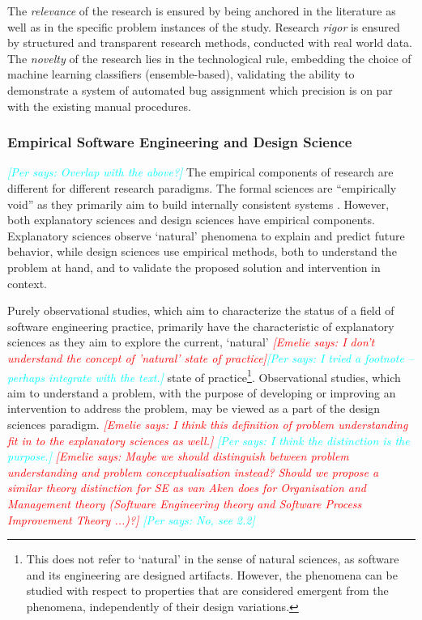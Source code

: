 \documentclass[graybox]{svmult}
\newcommand{\emelie}[1]{\textcolor{red}{{\it [Emelie says: #1]}}}
\newcommand{\per}[1]{\textcolor{cyan}{{\it [Per says: #1]}}}
\newcommand{\emelie}[1]{}
\newcommand{\per}[1]{}
\begin{document}
The \emph{relevance} of the research is ensured by being anchored in the literature as well as in the specific problem instances of the study. Research \emph{rigor} is ensured by structured and transparent research methods, conducted with real world data. The \emph{novelty} of the research lies in the technological rule, embedding the choice of machine learning classifiers (ensemble-based), validating the ability to demonstrate a system of automated bug assignment which precision is on par with the existing manual procedures.


 

\subsubsection{Empirical Software Engineering and Design Science} \per{Overlap with the above?}
The empirical components of research are different for different research paradigms. The formal sciences are ``empirically void'' as they primarily aim to build internally consistent systems \cite{van_aken_management_2004}. However, both explanatory sciences and design sciences have empirical components. Explanatory sciences observe `natural' phenomena to explain and predict future behavior, while design sciences use empirical methods, both to understand the problem at hand, and to validate the proposed solution and intervention in context. 

Purely observational studies, which aim to characterize the status of a field of software engineering practice, primarily have the characteristic of explanatory sciences as they aim to explore the current, `natural' \emelie{I don't understand the concept of 'natural' state of practice}\per{I tried a footnote -- perhaps integrate with the text.} state of practice\footnote{This does not refer to `natural' in the sense of natural sciences, as software and its engineering are designed artifacts. However, the phenomena can be studied with respect to properties that are considered emergent from the phenomena, independently of their design variations.}. Observational studies, which aim to understand a problem, with the purpose of developing or improving an intervention to address the problem, may be viewed as a part of the design sciences paradigm. 
\emelie{I think this definition of problem understanding fit in to the explanatory sciences as well.} \per{I think the distinction is the purpose.}
\emelie{Maybe we should distinguish between problem understanding and problem conceptualisation instead? Should we propose a similar theory distinction for SE as van Aken does for Organisation and Management theory (Software Engineering theory and Software Process Improvement Theory ...)?} \per{No, see 2.2}
\end{document}
